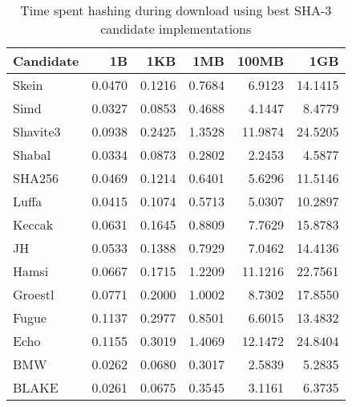 \begin{table} 
  \centering 
    \begin{tabular}{ | l | r | r | r | r | r | }
      \hline
      \textbf{Candidate} & \textbf{1B} & \textbf{1KB} & \textbf{1MB} & \textbf{100MB} & \textbf{1GB} \\ \hline
      Skein & 0.0470 & 0.1216 & 0.7684 & 6.9123 & 14.1415 \\ \hline
      Simd & 0.0327 & 0.0853 & 0.4688 & 4.1447 & 8.4779 \\ \hline
      Shavite3 & 0.0938 & 0.2425 & 1.3528 & 11.9874 & 24.5205 \\ \hline
      Shabal & 0.0334 & 0.0873 & 0.2802 & 2.2453 & 4.5877 \\ \hline
      SHA256 & 0.0469 & 0.1214 & 0.6401 & 5.6296 & 11.5146 \\ \hline
      Luffa & 0.0415 & 0.1074 & 0.5713 & 5.0307 & 10.2897 \\ \hline
      Keccak & 0.0631 & 0.1645 & 0.8809 & 7.7629 & 15.8783 \\ \hline
      JH & 0.0533 & 0.1388 & 0.7929 & 7.0462 & 14.4136 \\ \hline
      Hamsi & 0.0667 & 0.1715 & 1.2209 & 11.1216 & 22.7561 \\ \hline
      Groestl & 0.0771 & 0.2000 & 1.0002 & 8.7302 & 17.8550 \\ \hline
      Fugue & 0.1137 & 0.2977 & 0.8501 & 6.6015 & 13.4832 \\ \hline
      Echo & 0.1155 & 0.3019 & 1.4069 & 12.1472 & 24.8404 \\ \hline
      BMW & 0.0262 & 0.0680 & 0.3017 & 2.5839 & 5.2835 \\ \hline
      BLAKE & 0.0261 & 0.0675 & 0.3545 & 3.1161 & 6.3735 \\ \hline
      \end{tabular} 
      \caption{Time spent hashing during download using best SHA-3 candidate implementations}
      \label{tbl:tahoe:optimized_g}
\end{table}
